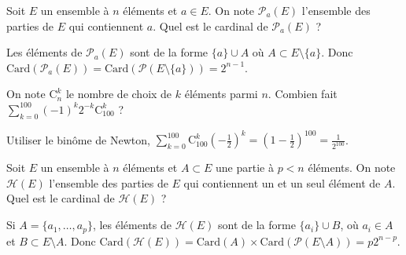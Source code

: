 \begin{question}
Soit $E$ un ensemble à $n$ éléments et $a\in E$. On note $\mathscr{P}_a(E)$ l'ensemble des parties de $E$ qui contiennent $a$. Quel est le cardinal de $\mathscr{P}_a(E)$ ?
\begin{answers}  
\end{answers}
\begin{explanations}
Les éléments de $\mathscr{P}_a(E)$ sont de la forme $\{a\}\cup A$ où $A\subset E\setminus \{a\}$. Donc $\mathrm{Card}(\mathscr{P}_a(E))=\mathrm{Card}(\mathscr{P}(E\setminus \{a\}))=2^{n-1}$.
\end{explanations}
\end{question}


\begin{question}
On note $\mathrm{C}^k_n$ le nombre de choix de $k$ éléments parmi $n$. Combien fait $\displaystyle \sum _{k=0}^{100}(-1)^k2^{-k}\mathrm{C}^k_{100}$ ?
\begin{answers}  
\end{answers}
\begin{explanations}
Utiliser le binôme de Newton, $\displaystyle \sum _{k=0}^{100}\mathrm{C}^k_{100}\left(-\frac{1}{2}\right)^k=\left(1-\frac{1}{2}\right)^{100}=\frac{1}{2^{100}}$.
\end{explanations}
\end{question}



\begin{question}
Soit $E$ un ensemble à $n$ éléments et $A\subset E$ une partie à $p < n$ éléments. On note $\mathscr{H}(E)$ l'ensemble des parties de $E$ qui contiennent un et un seul élément de $A$. Quel est le cardinal de $\mathscr{H}(E)$ ?
\begin{answers}  
\end{answers}
\begin{explanations}
Si $A=\{a_1,\dots ,a_p\}$, les éléments de $\mathscr{H}(E)$ sont de la forme $\{a_i\}\cup B$, où $a_i\in A$ et $B\subset E\setminus A$. Donc $\mathrm{Card}(\mathscr{H}(E))=\mathrm{Card}(A)\times \mathrm{Card}(\mathscr{P}(E\setminus A))=p2^{n-p}$.
\end{explanations}
\end{question}



